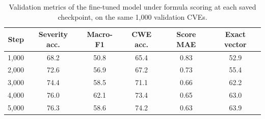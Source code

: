 \begin{table}[t]
\centering
\caption{Validation metrics of the fine-tuned model under formula scoring at each saved checkpoint, on the same 1,000 validation CVEs.}
\label{tab:ckpt}
\small
\begin{tabular}{rccccc}
\toprule
Step & Severity acc. & Macro-F1 & CWE acc. & Score MAE & Exact vector \\
\midrule
1{,}000 & 68.2 & 50.8 & 65.4 & 0.83 & 52.9 \\
2{,}000 & 72.6 & 56.9 & 67.2 & 0.73 & 55.4 \\
3{,}000 & 74.4 & 58.5 & 71.1 & 0.66 & 62.2 \\
4{,}000 & 76.0 & 62.1 & 73.4 & 0.65 & 63.0 \\
5{,}000 & 76.3 & 58.6 & 74.2 & 0.63 & 63.9 \\
\bottomrule
\end{tabular}
\end{table}
